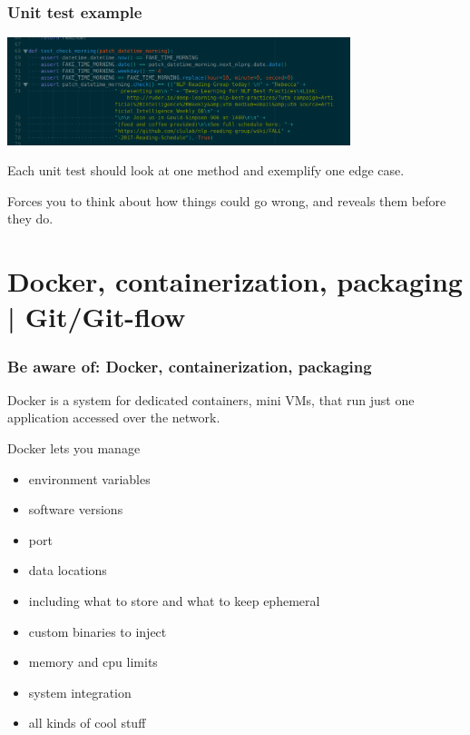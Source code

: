 \documentclass[10pt]{beamer}
\begin{document}
\begin{frame}[c]\frametitle{Unit test example}

    \centerline{\includegraphics[width=10cm]{figs/lingbottest.png}}

    \pause

    Each unit test should look at one method and exemplify one edge case.

    \pause

    Forces you to think about how things could go wrong, and reveals them before they do.

\end{frame}



















\section{Docker, containerization, packaging | Git/Git-flow}

\begin{frame}[c]\frametitle{Be aware of: Docker, containerization, packaging}

\pause

Docker is a system for dedicated containers, mini VMs, that run just one application accessed over the network.

Docker lets you manage

\begin{itemize}[<+->]
	\item environment variables
	\item software versions
	\item port
	\item data locations
	\item including what to store and what to keep ephemeral
	\item custom binaries to inject
	\item memory and cpu limits
	\item system integration
	\item all kinds of cool stuff
\end{itemize}

\end{frame}
\end{document}
